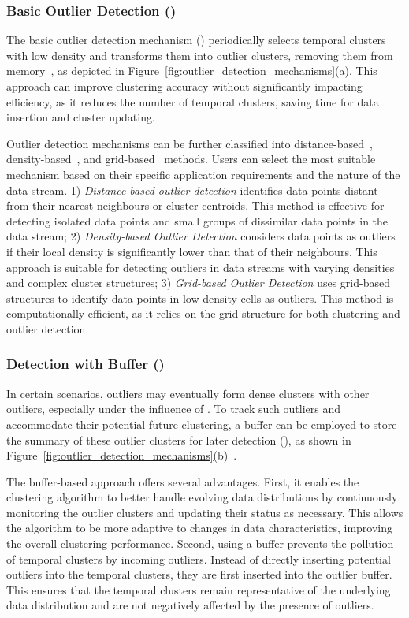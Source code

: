 \subsubsection{Basic Outlier Detection (\od)}
\label{subsec:detection}
The basic outlier detection mechanism (\od) periodically selects temporal clusters with low density and transforms them into outlier clusters, removing them from memory~\cite{Clustream:03,DStream:2007}, as depicted in Figure~\ref{fig:outlier_detection_mechanisms}(a). This approach can improve clustering accuracy without significantly impacting efficiency, as it reduces the number of temporal clusters, saving time for data insertion and cluster updating.

Outlier detection mechanisms can be further classified into distance-based~\cite{Clustream:03}, density-based~\cite{EDMStream:17}, and grid-based~\cite{DStream:2007} methods. Users can select the most suitable mechanism based on their specific application requirements and the nature of the data stream. 1) \emph{Distance-based outlier detection} identifies data points distant from their nearest neighbours or cluster centroids. This method is effective for detecting isolated data points and small groups of dissimilar data points in the data stream; 2) \emph{Density-based Outlier Detection} considers data points as outliers if their local density is significantly lower than that of their neighbours. This approach is suitable for detecting outliers in data streams with varying densities and complex cluster structures; 3) \emph{Grid-based Outlier Detection} uses grid-based structures to identify data points in low-density cells as outliers. This method is computationally efficient, as it relies on the grid structure for both clustering and outlier detection.

\subcompact
\subsubsection{Detection with Buffer (\buffer)}
\label{subsec:buffer}
In certain scenarios, outliers may eventually form dense clusters with other outliers, especially under the influence of \oef. To track such outliers and accommodate their potential future clustering, a buffer can be employed to store the summary of these outlier clusters for later detection (\buffer), as shown in Figure~\ref{fig:outlier_detection_mechanisms}(b)~\cite{DenStream:06,EDMStream:17}.

The buffer-based approach offers several advantages. First, it enables the clustering algorithm to better handle evolving data distributions by continuously monitoring the outlier clusters and updating their status as necessary. This allows the algorithm to be more adaptive to changes in data characteristics, improving the overall clustering performance. Second, using a buffer prevents the pollution of temporal clusters by incoming outliers. Instead of directly inserting potential outliers into the temporal clusters, they are first inserted into the outlier buffer. This ensures that the temporal clusters remain representative of the underlying data distribution and are not negatively affected by the presence of outliers.

